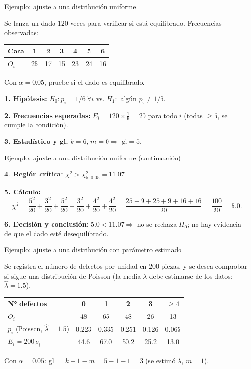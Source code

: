 \documentclass[aspectratio=169,11pt]{beamer}
\begin{document}
\begin{frame}{Ejemplo: ajuste a una distribución uniforme}
\begin{example}
Se lanza un dado $120$ veces para verificar si está equilibrado. Frecuencias observadas:
\begin{center}
\begin{tabular}{@{}lcccccc@{}}
\toprule
Cara & 1 & 2 & 3 & 4 & 5 & 6 \\
\midrule
$O_i$ & 25 & 17 & 15 & 23 & 24 & 16 \\
\bottomrule
\end{tabular}
\end{center}
Con $\alpha=0.05$, pruebe si el dado es equilibrado.

\textbf{1. Hipótesis:} $H_0: p_i=1/6\ \forall i$ vs. $H_1:$ algún $p_i\neq1/6$.

\textbf{2. Frecuencias esperadas:} $E_i=120\times\tfrac{1}{6}=20$ para todo $i$ (todas $\ge5$, se cumple la condición).

\textbf{3. Estadístico y gl:} $k=6$, $m=0 \Rightarrow$ gl$=5$.

\end{example}
\end{frame}

\begin{frame}{Ejemplo: ajuste a una distribución uniforme (continuación)}
\begin{example}
\textbf{4. Región crítica:} $\chi^2>\chi^2_{5,\,0.05}=11.07$.

\textbf{5. Cálculo:}
\[
\chi^2=\frac{5^2}{20}+\frac{3^2}{20}+\frac{5^2}{20}+\frac{3^2}{20}+\frac{4^2}{20}+\frac{4^2}{20}=\frac{25+9+25+9+16+16}{20}=\frac{100}{20}=5.0.
\]

\textbf{6. Decisión y conclusión:} $5.0<11.07\Rightarrow$ no se rechaza $H_0$; no hay evidencia de que el dado esté desequilibrado.
\end{example}
\end{frame}

\begin{frame}{Ejemplo: ajuste a una distribución con parámetro estimado}
\begin{example}
Se registra el número de defectos por unidad en $200$ piezas, y se desea comprobar si sigue una distribución de Poisson (la media $\lambda$ debe estimarse de los datos: $\hat\lambda=1.5$).
\begin{center}
\small
\begin{tabular}{@{}lccccc@{}}
\toprule
N° defectos & 0 & 1 & 2 & 3 & $\ge4$ \\
\midrule
$O_i$ & 48 & 65 & 48 & 26 & 13 \\
$p_i$ (Poisson, $\hat\lambda=1.5$) & 0.223 & 0.335 & 0.251 & 0.126 & 0.065 \\
$E_i=200\,p_i$ & 44.6 & 67.0 & 50.2 & 25.2 & 13.0 \\
\bottomrule
\end{tabular}
\end{center}
Con $\alpha=0.05$: gl $=k-1-m=5-1-1=3$ (se estimó $\lambda$, $m=1$).

\end{example}
\end{frame}
\end{document}
